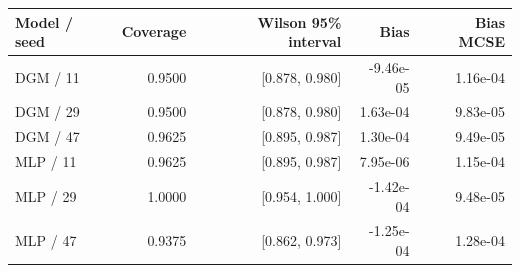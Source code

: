 \begin{tabular}{lrrrr}
\toprule
Model / seed & Coverage & Wilson 95\% interval & Bias & Bias MCSE \\
\midrule
DGM / 11 & 0.9500 & [0.878, 0.980] & -9.46e-05 & 1.16e-04 \\
DGM / 29 & 0.9500 & [0.878, 0.980] & 1.63e-04 & 9.83e-05 \\
DGM / 47 & 0.9625 & [0.895, 0.987] & 1.30e-04 & 9.49e-05 \\
MLP / 11 & 0.9625 & [0.895, 0.987] & 7.95e-06 & 1.15e-04 \\
MLP / 29 & 1.0000 & [0.954, 1.000] & -1.42e-04 & 9.48e-05 \\
MLP / 47 & 0.9375 & [0.862, 0.973] & -1.25e-04 & 1.28e-04 \\
\bottomrule
\end{tabular}
